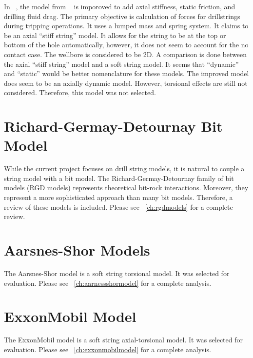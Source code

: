 In ~\cite{ref:zamanipour2018a}, the model from  ~\cite{ref:miska2015a} is imporoved to add axial stiffness, static friction, and drilling fluid drag.  The primary objective is calculation of forces for drillstrings during tripping operations.  It uses a lumped mass and spring system.  It claims to be an axial ``stiff string'' model.  It allows for the string to be at the top or bottom of the hole automatically, however, it does not seem to account for the no contact case.  The wellbore is considered to be 2D.  A comparison is done between the axial ``stiff string'' model and a soft string model.  It seems that ``dynamic'' and ``static'' would be better nomenclature for these models.  The improved model does seem to be an axially dynamic model.  However, torsional effects are still not considered.  Therefore, this model was not selected.

\section{Richard-Germay-Detournay Bit Model}
While the current project focuses on drill string models, it is natural to couple a string model with a bit model. The Richard-Germay-Detournay family of bit models (RGD models) represents theoretical bit-rock interactions.  Moreover, they represent a more sophisticated approach than many bit models.  Therefore, a review of these models is included.  Please see \chaptername~\ref{ch:rgdmodels} for a complete review.

\section{Aarsnes-Shor Models}
The Aarsnes-Shor model is a soft string torsional model.  It was selected for evaluation.  Please see \chaptername~\ref{ch:aarnessshormodel} for a complete analysis.

\section{ExxonMobil Model}
The ExxonMobil model is a soft string axial-torsional model.  It was selected for evaluation.  Please see \chaptername~\ref{ch:exxonmobilmodel} for a complete analysis.